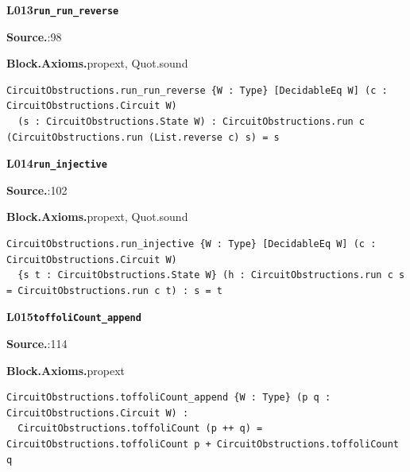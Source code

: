 \par\medskip\noindent\begin{minipage}{\textwidth}
{\small\bfseries L013\enspace\texttt{run\_run\_reverse}\par}
{\footnotesize\raggedright\textbf{Source.}\enspace{}:98\par
\textbf{Block.}\quad\textbf{Axioms.}\enspace propext, Quot.sound\par}\nopagebreak
\begin{lstlisting}
CircuitObstructions.run_run_reverse {W : Type} [DecidableEq W] (c : CircuitObstructions.Circuit W)
  (s : CircuitObstructions.State W) : CircuitObstructions.run c (CircuitObstructions.run (List.reverse c) s) = s
\end{lstlisting}
\end{minipage}\par

\par\medskip\noindent\begin{minipage}{\textwidth}
{\small\bfseries L014\enspace\texttt{run\_injective}\par}
{\footnotesize\raggedright\textbf{Source.}\enspace{}:102\par
\textbf{Block.}\quad\textbf{Axioms.}\enspace propext, Quot.sound\par}\nopagebreak
\begin{lstlisting}
CircuitObstructions.run_injective {W : Type} [DecidableEq W] (c : CircuitObstructions.Circuit W)
  {s t : CircuitObstructions.State W} (h : CircuitObstructions.run c s = CircuitObstructions.run c t) : s = t
\end{lstlisting}
\end{minipage}\par

\par\medskip\noindent\begin{minipage}{\textwidth}
{\small\bfseries L015\enspace\texttt{toffoliCount\_append}\par}
{\footnotesize\raggedright\textbf{Source.}\enspace{}:114\par
\textbf{Block.}\quad\textbf{Axioms.}\enspace propext\par}\nopagebreak
\begin{lstlisting}
CircuitObstructions.toffoliCount_append {W : Type} (p q : CircuitObstructions.Circuit W) :
  CircuitObstructions.toffoliCount (p ++ q) = CircuitObstructions.toffoliCount p + CircuitObstructions.toffoliCount q
\end{lstlisting}
\end{minipage}\par

